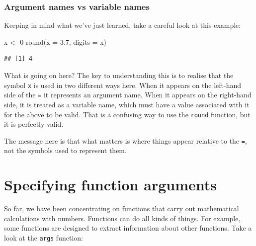 \documentclass[
]{book}
\newenvironment{Shaded}{\begin{snugshade}}{\end{snugshade}}
\newcommand{\AttributeTok}[1]{\textcolor[rgb]{0.77,0.63,0.00}{#1}}
\newcommand{\DecValTok}[1]{\textcolor[rgb]{0.00,0.00,0.81}{#1}}
\newcommand{\FloatTok}[1]{\textcolor[rgb]{0.00,0.00,0.81}{#1}}
\newcommand{\FunctionTok}[1]{\textcolor[rgb]{0.00,0.00,0.00}{#1}}
\newcommand{\NormalTok}[1]{#1}
\newcommand{\OtherTok}[1]{\textcolor[rgb]{0.56,0.35,0.01}{#1}}
\newenvironment{greybox}{
  \definecolor{shadecolor}{rgb}{0.95,0.95,0.95}  %
  \color{black}
  \begin{shaded}}
 {\end{shaded}}
\newenvironment{infobox}[1]
  {
  \begin{itemize}
  \renewcommand{\labelitemi}{
    \raisebox{-.7\height}[0pt][0pt]{
      {\setkeys{Gin}{width=3em,keepaspectratio}
        \texttt{[image: images/\#1]}}
    }
  }
  \setlength{\fboxsep}{1em}
  \begin{greybox}
  \item
  }
  {
  \end{greybox}
  \end{itemize}
  }
\begin{document}
\begin{infobox}{information}

\hypertarget{argument-names-vs-variable-names}{%
\subsubsection*{Argument names vs variable names}\label{argument-names-vs-variable-names}}

Keeping in mind what we've just learned, take a careful look at this example:

\begin{Shaded}
\begin{Highlighting}[]
\NormalTok{x }\OtherTok{\textless{}{-}} \DecValTok{0}
\FunctionTok{round}\NormalTok{(}\AttributeTok{x =} \FloatTok{3.7}\NormalTok{, }\AttributeTok{digits =}\NormalTok{ x)}
\end{Highlighting}
\end{Shaded}

\begin{verbatim}
## [1] 4
\end{verbatim}

What is going on here? The key to understanding this is to realise that the symbol \texttt{x} is used in two different ways here. When it appears on the left-hand side of the \texttt{=} it represents an argument name. When it appears on the right-hand side, it is treated as a variable name, which must have a value associated with it for the above to be valid. That is a confusing way to use the \texttt{round} function, but it is perfectly valid.

The message here is that what matters is where things appear relative to the \texttt{=}, not the symbols used to represent them.

\end{infobox}

\hypertarget{function-arguments}{%
\section{Specifying function arguments}\label{function-arguments}}

So far, we have been concentrating on functions that carry out mathematical calculations with numbers. Functions can do all kinds of things. For example, some functions are designed to extract information about other functions. Take a look at the \texttt{args} function:
\end{document}
